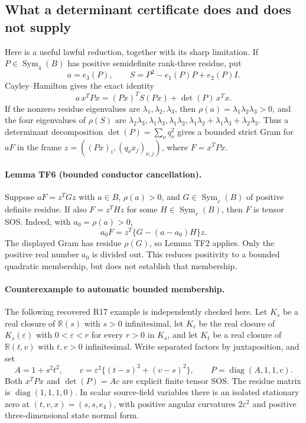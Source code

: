 \subsection{What a determinant certificate does and does not supply}
Here is a useful lawful reduction, together with its sharp limitation.
If $P\in\operatorname{Sym}_4(B)$ has positive semidefinite rank-three
residue, put
\[
 a=e_3(P),\qquad S=P^2-e_1(P)P+e_2(P)I.
\]
Cayley--Hamilton gives the exact identity
\[
 a\,x^TPx=(Px)^TS(Px)+\det(P)\,x^Tx.                 \tag{TF13}
\]
If the nonzero residue eigenvalues are $\lambda_1,\lambda_2,\lambda_3$,
then $\rho(a)=\lambda_1\lambda_2\lambda_3>0$, and the four
eigenvalues of $\rho(S)$ are
$\lambda_2\lambda_3,\lambda_1\lambda_3,\lambda_1\lambda_2,
\lambda_1\lambda_2+\lambda_1\lambda_3+\lambda_2\lambda_3$.
Thus a determinant decomposition $\det(P)=\sum_\nu q_\nu^2$
gives a bounded strict Gram for $aF$ in the frame
$z=((Px)_i,(q_\nu x_j)_{\nu,j})$, where $F=x^TPx$.

\paragraph{Lemma TF6 (bounded conductor cancellation).}
Suppose $aF=z^TGz$ with $a\in B$, $\rho(a)>0$, and
$G\in\operatorname{Sym}_r(B)$ of positive definite residue.
If also $F=z^THz$ for some $H\in\operatorname{Sym}_r(B)$, then
$F$ is tensor SOS. Indeed, with $a_0=\rho(a)>0$,
\[
 a_0F=z^T\{G-(a-a_0)H\}z.                           \tag{TF14}
\]
The displayed Gram has residue $\rho(G)$, so Lemma TF2 applies.
Only the positive real number $a_0$ is divided out. This reduces
positivity to a bounded quadratic membership, but does not establish
that membership.

\paragraph{Counterexample to automatic bounded membership.}
The following recovered R17 example is independently checked here.
Let $K_s$ be a real closure of $\mathbb R(s)$ with $s>0$
infinitesimal, let $K_c$ be the real closure of $K_s(\varepsilon)$
with $0<\varepsilon<r$ for every $r>0$ in $K_s$, and let $K_t$
be a real closure of $\mathbb R(t,v)$ with $t,v>0$ infinitesimal.
Write separated factors by juxtaposition, and set
\[
 A=1+s^2t^2,\qquad
 c=\varepsilon^2\{(t-s)^2+(v-s)^2\},\qquad
 P=\operatorname{diag}(A,1,1,c).                     \tag{TF15}
\]
Both $x^TPx$ and $\det(P)=Ac$ are explicit finite tensor SOS.
The residue matrix is $\operatorname{diag}(1,1,1,0)$.
In scalar source-field variables there is an isolated stationary
zero at $(t,v,x)=(s,s,e_4)$, with positive angular curvatures
$2\varepsilon^2$ and positive three-dimensional state normal form.


